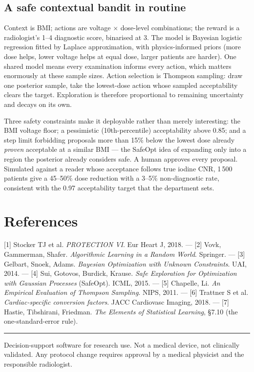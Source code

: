 \documentclass[10pt,a4paper,twocolumn]{article}
\begin{document}
\subsection{A safe contextual bandit in routine}

Context is BMI; actions are voltage $\times$ dose-level combinations; the reward is a radiologist's 1--4
diagnostic score, binarised at 3. The model is Bayesian logistic regression fitted by Laplace approximation,
with physics-informed priors (more dose helps, lower voltage helps at equal dose, larger patients are harder).
One shared model means every examination informs every action, which matters enormously at these sample sizes.
Action selection is Thompson sampling: draw one posterior sample, take the lowest-dose action whose sampled
acceptability clears the target. Exploration is therefore proportional to remaining uncertainty and decays on
its own.

Three safety constraints make it deployable rather than merely interesting: the BMI voltage floor; a
pessimistic (10th-percentile) acceptability above 0.85; and a step limit forbidding proposals more than 15\%
below the lowest dose already \emph{proven} acceptable at a similar BMI — the SafeOpt idea of expanding only
into a region the posterior already considers safe. A human approves every proposal. Simulated against a reader
whose acceptance follows true iodine CNR, 1\,500 patients give a 45--50\% dose reduction with a 3--5\%
non-diagnostic rate, consistent with the 0.97 acceptability target that the department sets.

\section*{\small References}
{\footnotesize
[1] Stocker TJ et al. \textit{PROTECTION VI}. Eur Heart J, 2018. ---
[2] Vovk, Gammerman, Shafer. \textit{Algorithmic Learning in a Random World}. Springer. ---
[3] Gelbart, Snoek, Adams. \textit{Bayesian Optimization with Unknown Constraints}. UAI, 2014. ---
[4] Sui, Gotovos, Burdick, Krause. \textit{Safe Exploration for Optimization with Gaussian Processes}
(SafeOpt). ICML, 2015. ---
[5] Chapelle, Li. \textit{An Empirical Evaluation of Thompson Sampling}. NIPS, 2011. ---
[6] Trattner S et al. \textit{Cardiac-specific conversion factors}. JACC Cardiovasc Imaging, 2018. ---
[7] Hastie, Tibshirani, Friedman. \textit{The Elements of Statistical Learning}, §7.10 (the one-standard-error
rule).
\par}

\vspace{4pt}
{\scriptsize\color{ctink2}\hrule\vspace{3pt}
Decision-support software for research use. Not a medical device, not clinically validated. Any protocol change
requires approval by a medical physicist and the responsible radiologist.\par}
\end{document}
